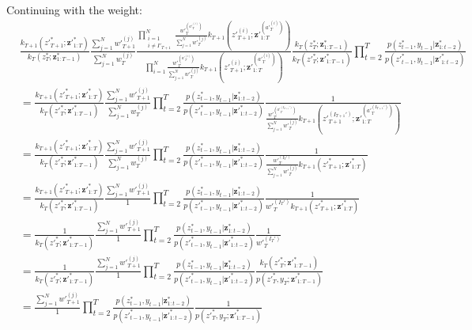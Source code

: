 \documentclass[11pt]{article}
\newcommand{\z}{\mathbf{z}}
\begin{document}
Continuing with the weight:
\begin{align*}
& \frac{
k_{T+1}({z'}_{T+1}^*; {\z'}_{1:T}^*) 
}{
k_T(z_T^*; \z_{1:T-1}^*)
}
\frac{
\sum_{j=1}^N {w'}_{T+1}^{(j)}
}{
\sum_{j=1}^N {w}_{T}^{(j)}
}
\frac{
\displaystyle \prod_{\substack{i=1\\i \ne I'_{T+1}}}^N \frac{{w'}_{T}^{({a'}_{T}^{(i)})}}{\sum_{j=1}^N {w'}_{T}^{(j)}} k_{T+1}({z'}_{T+1}^{(i)}; {\z'}_{1:T}^{({a'}_{T}^{(i)})} )
}{
\displaystyle \prod_{i=1}^N \frac{{w'}_{T}^{({a'}_{T}^{(i)})}}{\sum_{j=1}^N {w'}_{T}^{(j)}} k_{T+1}({z'}_{T+1}^{(i)}; {\z'}_{1:T}^{({a'}_{T}^{(i)})} )
}
\frac{
k_T(z_T^*; \z_{1:T-1}^*)
}{
k_T({z'}_T^*; {\z'}_{1:T-1}^*)
}
\prod_{t=2}^T \frac{p(z_{t-1}^*, y_{t-1} | {\z}_{1:t-2}^{*})}{p({z'}_{t-1}^*, y_{t-1} | {\z'}_{1:t-2}^*)}\\
&=
\frac{
k_{T+1}({z'}_{T+1}^*; {\z'}_{1:T}^*)
}{
k_T({z'}_T^*; {\z'}_{1:T-1}^*)
}
\frac{
\sum_{j=1}^N {w'}_{T+1}^{(j)}
}{
\sum_{j=1}^N {w}_{T}^{(j)}
}
\prod_{t=2}^T \frac{p(z_{t-1}^*, y_{t-1} | {\z}_{1:t-2}^{*})}{p({z'}_{t-1}^*, y_{t-1} | {\z'}_{1:t-2}^*)}
\frac{1}{
\frac{{w'}_{T}^{({a'}_{T}^{(I_{T+1}')})}}{\sum_{j=1}^N {w'}_{T}^{(j)}} k_{T+1}({z'}_{T+1}^{(I_{T+1}')}; {\z'}_{1:T}^{({a'}_{T}^{(I_{T+1}')})} )
}\\
&=
\frac{
k_{T+1}({z'}_{T+1}^*; {\z'}_{1:T}^*)
}{
k_T({z'}_T^*; {\z'}_{1:T-1}^*)
}
\frac{
\sum_{j=1}^N {w'}_{T+1}^{(j)}
}{
\sum_{j=1}^N {w}_{T}^{(j)}
}
\prod_{t=2}^T \frac{p(z_{t-1}^*, y_{t-1} | {\z}_{1:t-2}^{*})}{p({z'}_{t-1}^*, y_{t-1} | {\z'}_{1:t-2}^*)}
\frac{1}{
\frac{{w'}_{T}^{(I_T')}}{\sum_{j=1}^N {w'}_{T}^{(j)}} k_{T+1}({z'}_{T+1}^{*}; {\z'}_{1:T}^{*} )
}\\
&= \frac{
k_{T+1}({z'}_{T+1}^*; {\z'}_{1:T}^*)
}{
k_T({z'}_T^*; {\z'}_{1:T-1}^*)
}
\frac{
\sum_{j=1}^N {w'}_{T+1}^{(j)}
}{
1
}
\prod_{t=2}^T \frac{p(z_{t-1}^*, y_{t-1} | {\z}_{1:t-2}^{*})}{p({z'}_{t-1}^*, y_{t-1} | {\z'}_{1:t-2}^*)}
\frac{1}{
{w'}_{T}^{(I_T')} k_{T+1}({z'}_{T+1}^{*}; {\z'}_{1:T}^{*} )
}\\
&= \frac{
1
}{
k_T({z'}_T^*; {\z'}_{1:T-1}^*)
}
\frac{
\sum_{j=1}^N {w'}_{T+1}^{(j)}
}{
1
}
\prod_{t=2}^T \frac{p(z_{t-1}^*, y_{t-1} | {\z}_{1:t-2}^{*})}{p({z'}_{t-1}^*, y_{t-1} | {\z'}_{1:t-2}^*)}
\frac{1}{
{w'}_{T}^{(I_T')}
}\\
&= \frac{
1
}{
k_T({z'}_T^*; {\z'}_{1:T-1}^*)
}
\frac{
\sum_{j=1}^N {w'}_{T+1}^{(j)}
}{
1
}
\prod_{t=2}^T \frac{p(z_{t-1}^*, y_{t-1} | {\z}_{1:t-2}^{*})}{p({z'}_{t-1}^*, y_{t-1} | {\z'}_{1:t-2}^*)}
\frac{
k_T({z'}_{T}^*; {\z'}_{1:T-1}^*)
}{
p({z'}_{T}^*, y_T; {\z'}_{1:T-1}^*)
}\\
&=
\frac{
\sum_{j=1}^N {w'}_{T+1}^{(j)}
}{
1
}
\prod_{t=2}^T \frac{p(z_{t-1}^*, y_{t-1} | {\z}_{1:t-2}^{*})}{p({z'}_{t-1}^*, y_{t-1} | {\z'}_{1:t-2}^*)}
\frac{
1
}{
p({z'}_{T}^*, y_T; {\z'}_{1:T-1}^*)
}
\end{align*}

 
\end{document}

